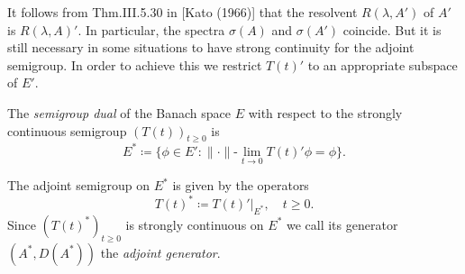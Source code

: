 It follows from Thm.III.5.30 in [Kato (1966)] that the resolvent $R(\lambda,A')$ of $A'$ is $R(\lambda,A)'$.
In particular, the spectra $\sigma(A)$ and $\sigma(A')$ coincide.
But it is still necessary in some situations to have strong continuity for the adjoint semigroup.
In order to achieve this we restrict $T(t)'$ to an appropriate subspace of $E'$.

\begin{definition}\label{def:a1-3.1}
The \emph{semigroup dual} of the Banach space $E$ with respect to the strongly continuous semigroup $(T(t))_{t \geq 0}$ is
\[
    E^{*} \coloneqq \{\phi \in E': \|\cdot\|\text{-}\lim_{t \to 0} T(t)'\phi = \phi\}.
\]


\newpage

The adjoint semigroup on $E^{*}$ is given by the operators
\[
    T(t)^{*} \coloneqq T(t)'|_{E^{*}}, \quad t \geq 0.
\]
Since $(T(t)^{*})_{t \geq 0}$ is strongly continuous on $E^{*}$ we call its generator $(A^{*},D(A^{*}))$ the \emph{adjoint generator}.
\end{definition}

